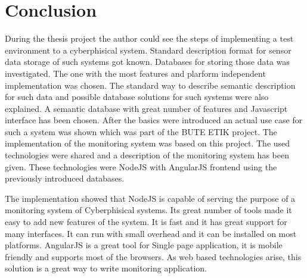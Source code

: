 \section{Conclusion}
During the thesis project the author could see the steps of implementing a test environment to a cyberphisical system. Standard description format for sensor data storage of such systems got known. Databases for storing those data was investigated. The one with the most features and plarform independent implementation was chosen. The standard way to describe semantic description for such data and possible database solutions for such systems were also explained. A semantic database with great number of features and Javascript interface has been chosen. After the basics were introduced an actual use case for such a system was shown which was part of the BUTE ETIK project. The implementation of the monitoring system was based on this project. The used technologies were shared and a description of the monitoring system has been given. These technologies were NodeJS with AngularJS frontend using the previously introduced databases. 

The implementation showed that NodeJS is capable of serving the purpose of a monitoring system of Cyberphisical systems. Its great number of tools made it easy to add new features of the system. It is fast and it has great support for many interfaces. It can run with small overhead and it can be installed on most platforms. AngularJS is a great tool for Single page application, it is mobile friendly and supports most of the browsers. As web based technologies arise, this solution is a great way to write monitoring application. 

